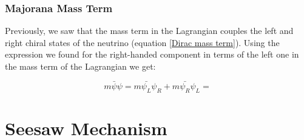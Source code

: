 \subsubsection{Majorana Mass Term}

Previously, we saw that the mass term in the Lagrangian couples the left and right chiral states of the neutrino (equation \ref{Dirac mass term}). 
Using the expression we found for the right-handed component in terms of the left one in the mass term of the Lagrangian we get:

\begin{equation}
m \bar{\psi}\psi = m \bar{\psi_L} \psi_R + m \bar{\psi_R}\psi_L = 
\end{equation}




\section{Seesaw Mechanism}









